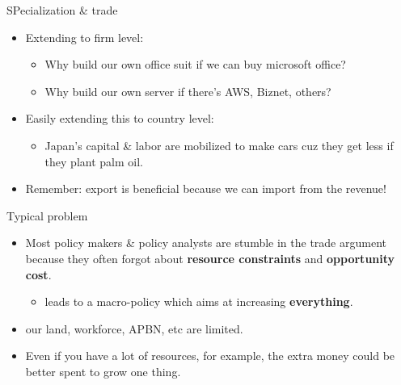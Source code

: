 \documentclass[
  ignorenonframetext,
]{beamer}
\providecommand{\tightlist}{%
  \setlength{\itemsep}{0pt}\setlength{\parskip}{0pt}}\usepackage{longtable,booktabs,array}
\begin{document}
\begin{frame}{SPecialization \& trade}
\protect\hypertarget{specialization-trade-1}{}
\begin{itemize}
\item
  Extending to firm level:

  \begin{itemize}
  \item
    Why build our own office suit if we can buy microsoft office?
  \item
    Why build our own server if there's AWS, Biznet, others?
  \end{itemize}
\item
  Easily extending this to country level:

  \begin{itemize}
  \tightlist
  \item
    Japan's capital \& labor are mobilized to make cars cuz they get
    less if they plant palm oil.
  \end{itemize}
\item
  Remember: export is beneficial because we can import from the revenue!
\end{itemize}
\end{frame}

\begin{frame}{Typical problem}
\protect\hypertarget{typical-problem}{}
\begin{itemize}
\item
  Most policy makers \& policy analysts are stumble in the trade
  argument because they often forgot about \textbf{resource constraints}
  and \textbf{opportunity cost}.

  \begin{itemize}
  \tightlist
  \item
    leads to a macro-policy which aims at increasing
    \textbf{everything}.
  \end{itemize}
\item
  our land, workforce, APBN, etc are limited.
\item
  Even if you have a lot of resources, for example, the extra money
  could be better spent to grow one thing.
\end{itemize}
\end{frame}
\end{document}
